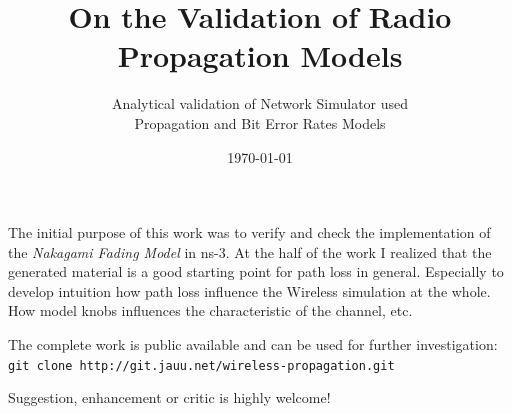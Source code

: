 \documentclass[9pt]{article}
\begin{document}
\title{On the Validation of Radio Propagation Models}

\subtitle{Analytical validation of Network Simulator used\\Propagation and Bit Error Rates Models}

\date{\today}
\maketitle

\begin{slide}
\bi
	\item The initial purpose of this work was to verify and
	      check the implementation of the \textit{Nakagami Fading Model}
		  in ns-3. At the half of the work I realized that the generated
		  material is a good starting point for path loss in general.
		  Especially to develop intuition how path loss influence the Wireless
		  simulation at the whole. How model knobs influences the
		  characteristic of the channel, etc.

	\item The complete work is public available and can be used for further
	      investigation:\newline
	      \verb+git clone http://git.jauu.net/wireless-propagation.git+

	\item Suggestion, enhancement or critic is highly welcome!
\ei
\end{slide}
\end{document}
